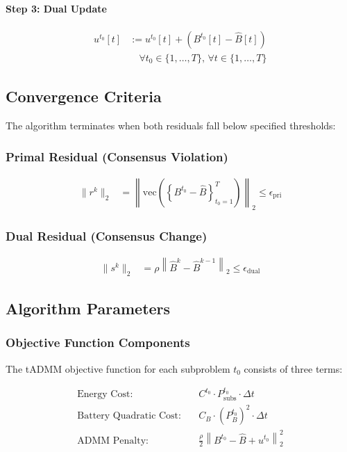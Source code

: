 \paragraph{Step 3: Dual Update}
\begin{align}
u^{t_0}[t] &:= u^{t_0}[t] + \left( B^{t_0}[t] - \hat{B}[t] \right) \\
&\quad \forall t_0 \in \{1, \ldots, T\}, \, \forall t \in \{1, \ldots, T\}
\end{align}

\subsection{Convergence Criteria}

The algorithm terminates when both residuals fall below specified thresholds:

\subsubsection{Primal Residual (Consensus Violation)}
\begin{align}
\|r^k\|_2 &= \left\| \text{vec}\left( \left\{ B^{t_0} - \hat{B} \right\}_{t_0=1}^T \right) \right\|_2 \leq \epsilon_{\text{pri}}
\end{align}

\subsubsection{Dual Residual (Consensus Change)}
\begin{align}
\|s^k\|_2 &= \rho \left\| \hat{B}^k - \hat{B}^{k-1} \right\|_2 \leq \epsilon_{\text{dual}}
\end{align}

\subsection{Algorithm Parameters}

\subsubsection{Objective Function Components}

The tADMM objective function for each subproblem $t_0$ consists of three terms:

\begin{align}
\text{Energy Cost:} \quad & C^{t_0} \cdot P_{\text{subs}}^{t_0} \cdot \Delta t \\
\text{Battery Quadratic Cost:} \quad & C_B \cdot \left(P_{B}^{t_0}\right)^2 \cdot \Delta t \\
\text{ADMM Penalty:} \quad & \frac{\rho}{2} \left\| B^{t_0} - \hat{B} + u^{t_0} \right\|_2^2
\end{align}

